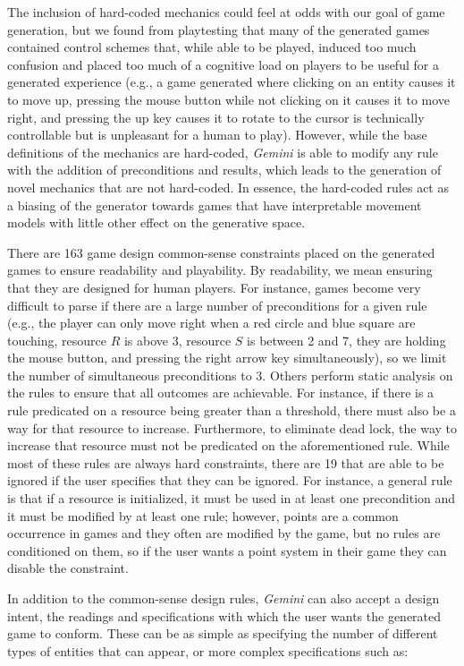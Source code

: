\documentclass[12pt]{report}
\begin{document}
The inclusion of hard-coded mechanics could feel at odds with our goal of game generation, but we found from playtesting that many of the generated games contained control schemes that, while able to be played, induced too much confusion and placed too much of a cognitive load on players to be useful for a generated experience (e.g., a game generated where clicking on an entity causes it to move up, pressing the mouse button while not clicking on it causes it to move right, and pressing the up key causes it to rotate to the cursor is technically controllable but is unpleasant for a human to play).  However, while the base definitions of the mechanics are hard-coded, \textit{Gemini} is able to modify any rule with the addition of preconditions and results, which leads to the generation of novel mechanics that are not hard-coded.  In essence, the hard-coded rules act as a biasing of the generator towards games that have interpretable movement models with little other effect on the generative space. 

There are 163 game design common-sense constraints placed on the generated games to ensure readability and playability. By readability, we mean ensuring that they are designed for human players.  For instance, games become very difficult to parse if there are a large number of preconditions for a given rule (e.g., the player can only move right when a red circle and blue square are touching, resource $R$ is above 3, resource $S$ is between 2 and 7, they are holding the mouse button, and pressing the right arrow key simultaneously), so we limit the number of simultaneous preconditions to 3.  Others perform static analysis on the rules to ensure that all outcomes are achievable.  For instance, if there is a rule predicated on a resource being greater than a threshold, there must also be a way for that resource to increase.  Furthermore, to eliminate dead lock, the way to increase that resource must not be predicated on the aforementioned rule.  While most of these rules are always hard constraints, there are 19 that are able to be ignored if the user specifies that they can be ignored.  For instance, a general rule is that if a resource is initialized, it must be used in at least one precondition and it must be modified by at least one rule; however, points are a common occurrence in games and they often are modified by the game, but no rules are conditioned on them, so if the user wants a point system in their game they can disable the constraint.

In addition to the common-sense design rules, \textit{Gemini} can also accept a design intent, the readings and specifications with which the user wants the generated game to conform.  These can be as simple as specifying the number of different types of entities that can appear, or more complex specifications such as:
\end{document}
